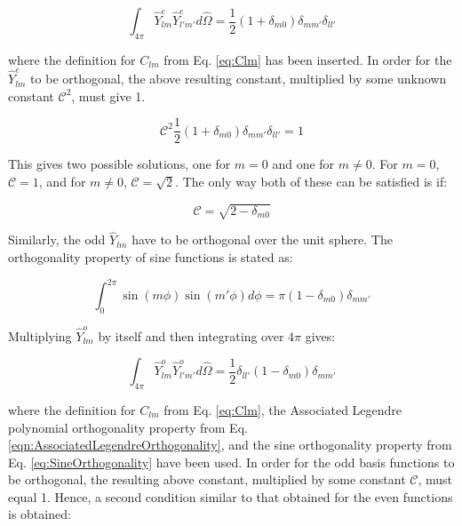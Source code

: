 \documentclass[10pt]{article}
\begin{document}
\begin{flushleft}
\begin{tcolorbox}[breakable]
\begin{equation}
\label{eq:EvenRequriedOrthogonality2}
\int_{4\pi}^{}\hat{Y}_{lm}^e\hat{Y}_{l'm'}^ed\hat{\Omega}=\frac{1}{2}(1+\delta_{m0})\delta_{mm'}\delta_{ll'}
\end{equation}

where the definition for \(C_{lm}\) from Eq. \eqref{eq:Clm} has been inserted. In order for the \(\hat{Y}_{lm}^e\) to be orthogonal, the above resulting constant, multiplied by some unknown constant \(\mathscr{C}^2\), must give 1. 

\begin{equation}
\mathscr{C}^2\frac{1}{2}(1+\delta_{m0})\delta_{mm'}\delta_{ll'}=1
\end{equation}

This gives two possible solutions, one for \(m=0\) and one for \(m\neq 0\). For \(m=0\), \(\mathscr{C}=1\), and for \(m\neq0\), \(\mathscr{C}=\sqrt{2}\). The only way both of these can be satisfied is if:

\begin{equation}
\mathscr{C}=\sqrt{2-\delta_{m0}}
\end{equation}

Similarly, the odd \(\hat{Y}_{lm}\) have to be orthogonal over the unit sphere. The orthogonality property of sine functions is stated as:

\begin{equation}
\label{eq:SineOrthogonality}
\int_{0}^{2\pi}\sin{(m\phi)}\sin{(m'\phi)}d\phi=\pi(1-\delta_{m0})\delta_{mm'}
\end{equation}

Multiplying \(\hat{Y}_{lm}^o\) by itself and then integrating over \(4\pi\) gives:

\begin{equation}
\label{eq:OddRequriedOrthogonality2}
\int_{4\pi}^{}\hat{Y}_{lm}^o\hat{Y}_{l'm'}^od\hat{\Omega}=\frac{1}{2}\delta_{ll'}(1-\delta_{m0})\delta_{mm'}
\end{equation}

where the definition for \(C_{lm}\) from Eq. \eqref{eq:Clm}, the Associated Legendre polynomial orthogonality property from Eq. \eqref{eqn:AssociatedLegendreOrthogonality}, and the sine orthogonality property from Eq. \eqref{eq:SineOrthogonality} have been used. In order for the odd basis functions to be orthogonal, the resulting above constant, multiplied by some constant \(\mathscr{C}\), must equal 1. Hence, a second condition similar to that obtained for the even functions is obtained:


\end{tcolorbox}
\end{flushleft}
\end{document}
